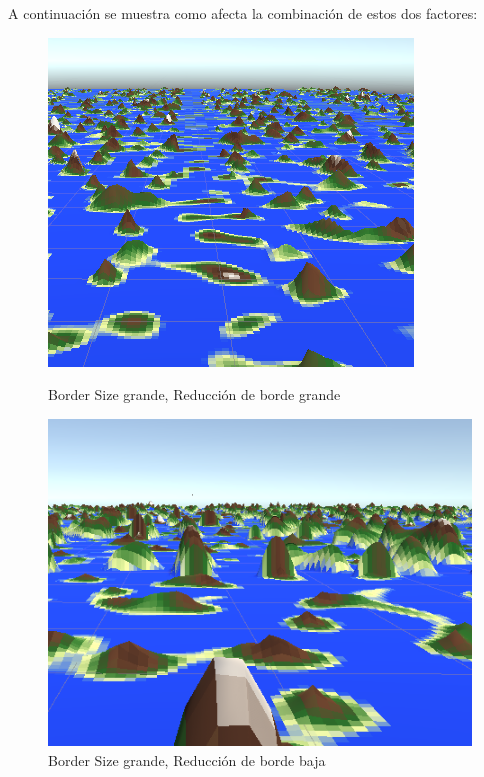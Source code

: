 A continuación se muestra como afecta la combinación de estos dos factores:
\begin{figure}[ht]
    \centering
    \begin{minipage}{0.4\textwidth}
        \centering
        \includegraphics[width=\textwidth]{img/hightbordersize-hightborderred.png}
        \caption{Border Size grande, Reducción de borde grande}
    \end{minipage}%
    \hfill
    \begin{minipage}{0.4\textwidth}
        \centering
        \includegraphics[width=\textwidth]{img/hightbordersize-lowborderred.png}
        \caption{Border Size grande, Reducción de borde baja}
    \end{minipage}
    

\end{figure}
